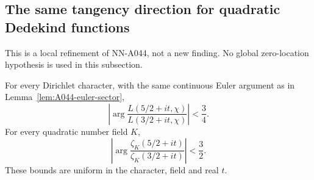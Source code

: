 \subsection{The same tangency direction for quadratic Dedekind functions}
\label{sec:A044-quadratic}

This is a local refinement of NN-A044, not a new finding.
No global zero-location hypothesis is used in this subsection.

\begin{lemma}
\label{lem:A044-sharper-sector}
For every Dirichlet character, with the same continuous Euler
argument as in Lemma~\ref{lem:A044-euler-sector},
\[
 \left|\arg\frac{L(5/2+it,\chi)}{L(3/2+it,\chi)}\right|<\frac34.
\]
For every quadratic number field \(K\),
\[
 \left|\arg\frac{\zeta_K(5/2+it)}{\zeta_K(3/2+it)}\right|<\frac32.
\]
These bounds are uniform in the character, field and real \(t\).
\end{lemma}

